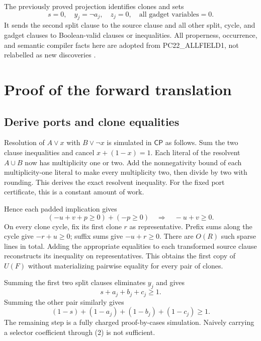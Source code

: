 \documentclass[11pt]{article}
\newcommand{\CP}{\mathsf{CP}}
\begin{document}
The previously proved projection identifies clones and sets
\[
            s=0,\quad y_j=\neg a_j,\quad z_j=0,
            \quad\text{all gadget variables}=0.                       \tag{4}
\]
It sends the second split clause to the source clause and all other split,
cycle, and gadget clauses to Boolean-valid clauses or inequalities. All
properness, occurrence, and semantic compiler facts here are adopted from
PC22\_ALLFIELD1, not relabelled as new discoveries \cite{pc22,pcretract}.

\section{Proof of the forward translation}
\subsection{Derive ports and clone equalities}
Resolution of $A\lor x$ with $B\lor\neg x$ is simulated in $\CP$ as follows.
Sum the two clause inequalities and cancel $x+(1-x)=1$. Each literal of the
resolvent $A\cup B$ now has multiplicity one or two. Add the nonnegativity
bound of each multiplicity-one literal to make every multiplicity two, then
divide by two with rounding. This derives the exact resolvent inequality.
For the fixed port certificate, this is a constant amount of work.

Hence each padded implication gives
\[
 (-u+v+p\ge0)+(-p\ge0)\quad\Longrightarrow\quad -u+v\ge0.             \tag{5}
\]
On every clone cycle, fix its first clone $r$ as representative. Prefix sums
along the cycle give $-r+u\ge0$; suffix sums give $-u+r\ge0$.
There are $O(R)$ such sparse lines in total. Adding the appropriate
equalities to each transformed source clause reconstructs its inequality
on representatives. This obtains the first copy of $U(F)$ without
materializing pairwise equality for every pair of clones.

Summing the first two split clauses eliminates $y_j$ and gives
\[
             s+a_j+b_j+c_j\ge1.                                     \tag{6}
\]
Summing the other pair similarly gives
\[
        (1-s)+(1-a_j)+(1-b_j)+(1-c_j)\ge1.                            \tag{7}
\]
The remaining step is a fully charged proof-by-cases simulation. Naively
carrying a selector coefficient through (2) is not sufficient.
\end{document}
